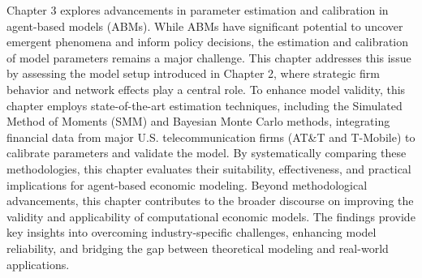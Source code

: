 \documentclass[11pt]{article}
\begin{document}
\vspace{5mm}

Chapter 3 explores advancements in parameter estimation and calibration in agent-based models (ABMs). While ABMs have significant potential to uncover emergent phenomena and inform policy decisions, the estimation and calibration of model parameters remains a major challenge. This chapter addresses this issue by assessing the model setup introduced in Chapter 2, where strategic firm behavior and network effects play a central role.
To enhance model validity, this chapter employs state-of-the-art estimation techniques, including the Simulated Method of Moments (SMM) and Bayesian Monte Carlo methods, integrating financial data from major U.S. telecommunication firms (AT\&T and T-Mobile) to calibrate parameters and validate the model. By systematically comparing these methodologies, this chapter evaluates their suitability, effectiveness, and practical implications for agent-based economic modeling.
Beyond methodological advancements, this chapter contributes to the broader discourse on improving the validity and applicability of computational economic models. The findings provide key insights into overcoming industry-specific challenges, enhancing model reliability, and bridging the gap between theoretical modeling and real-world applications.




\newpage
\printbibliography
\end{document}
